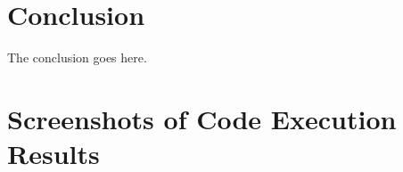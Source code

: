 \documentclass[journal,10pt]{IEEEtran}
\begin{document}




\section{Conclusion}
The conclusion goes here.


\appendices


%


\onecolumn %
\section{Screenshots of Code Execution Results}
\end{document}
